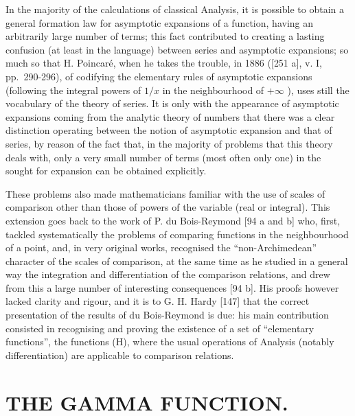 In the majority of the calculations of classical Analysis, it is possible to obtain a general formation law for asymptotic expansions of a function, having an arbitrarily large number of terms; this fact contributed to creating a lasting confusion (at least in the language) between series and asymptotic expansions; so much so that H. Poincaré, when he takes the trouble, in 1886 ({[}251 a{]}, v. I, pp.~290-296), of codifying the elementary rules of asymptotic expansions (following the integral powers of \(1/x\) in the neighbourhood of \(+\infty\) ), uses still the vocabulary of the theory of series. It is only with the appearance of asymptotic expansions coming from the analytic theory of numbers that there was a clear distinction operating between the notion of asymptotic expansion and that of series, by reason of the fact that, in the majority of problems that this theory deals with, only a very small number of terms (most often only one) in the sought for expansion can be obtained explicitly.

These problems also made mathematicians familiar with the use of scales of comparison other than those of powers of the variable (real or integral). This extension goes back to the work of P. du Bois-Reymond {[}94 a and b{]} who, first, tackled systematically the problems of comparing functions in the neighbourhood of a point, and, in very original works, recognised the ``non-Archimedean'' character of the scales of comparison, at the same time as he studied in a general way the integration and differentiation of the comparison relations, and drew from this a large number of interesting consequences {[}94 b{]}. His proofs however lacked clarity and rigour, and it is to G. H. Hardy {[}147{]} that the correct presentation of the results of du Bois-Reymond is due: his main contribution consisted in recognising and proving the existence of a set of ``elementary functions'', the functions (H), where the usual operations of Analysis (notably differentiation) are applicable to comparison relations.

\chapter{THE GAMMA FUNCTION.}


